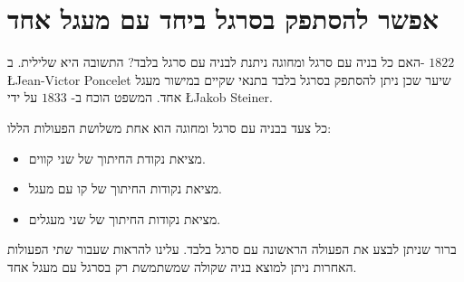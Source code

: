 



\chapter{אפשר להסתפק בסרגל ביחד עם מעגל אחד}\label{c.straightedge}



האם כל בניה עם סרגל ומחוגה ניתנת לבניה עם סרגל בלבד? התשובה היא שלילית. ב-%
$1822$
\L{Jean-Victor Poncelet}
שיער שכן ניתן להסתפק בסרגל בלבד בתנאי שקיים במישור מעגל אחד.
המשפט הוכח ב-%
$1833$
על ידי
\L{Jakob Steiner}.



כל צעד בבניה עם סרגל ומחוגה הוא אחת משלושת הפעולות הללו:
\begin{itemize}
\setlength{\itemsep}{0pt}
\item
מציאת נקודת החיתוך של שני קווים.
\item
מציאת נקודות החיתוך של קו עם מעגל.
\item
מציאת נקודות החיתוך של שני מעגלים.
\end{itemize}
ברור שניתן לבצע את הפעולה הראשונה עם סרגל בלבד. עלינו להראות שעבור שתי הפעולות האחרות ניתן למוצא בניה שקולה שמשתמשת רק בסרגל עם מעגל אחד.



